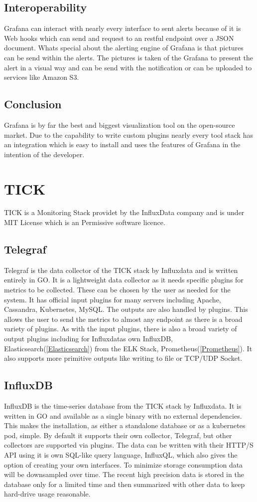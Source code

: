 \subsection{Interoperability}
Grafana can interact with nearly every interface to sent alerts because of it is Web hooks which can send and request to an restful endpoint over a JSON document. Whats special about the alerting engine of Grafana is that pictures can be send within the alerts. The pictures is taken of the Grafana to present the alert in a visual way and can be send with the notification or can be uploaded to services like Amazon S3.

\subsection{Conclusion}
Grafana is by far the best and biggest visualization tool on the open-source market. Due to the capability to write custom plugins nearly every tool stack has an integration which is easy to install and uses the features of Grafana in the intention of the developer.

\section{TICK}
\label{tick}
TICK is a Monitoring Stack providet by the InfluxData company and is under MIT License which is an Permissive software licence.
\subsection{Telegraf}
Telegraf is the data collector of the TICK stack by Influxdata and is written entirely in GO. It is a lightweight data collector as it needs specific plugins for metrics to be collected. These can be chosen by the user as needed for the system. It has official input plugins for many servers including Apache, Cassandra, Kubernetes, MySQL.
The outputs are also handled by plugins. This allows the user to send the metrics to almost any endpoint as there is a broad variety of plugins. As with the input plugins, there is also a broad variety of output plugins including for Influxdatas own InfluxDB, Elasticsearch(\ref{Elasticsearch}) from the ELK Stack, Prometheus(\ref{Prometheus}). It also supports more primitive outputs like writing to file or TCP/UDP Socket.
\subsection{InfluxDB}
InfluxDB is the time-series database from the TICK stack by Influxdata. It is written in GO and available as a single binary with no external dependencies. This makes the installation, as either a standalone database or as a kubernetes pod, simple.
By default it supports their own collector, Telegraf, but other collectors are supported via plugins. The data can be written with their  HTTP/S API using it is own SQL-like query language, InfluxQL, which also gives the option of creating your own interfaces.
To minimize storage consumption data will be downsampled over time. The recent high precision data is stored in the database only for a limited time and then summarized with other data to keep hard-drive usage reasonable. 
